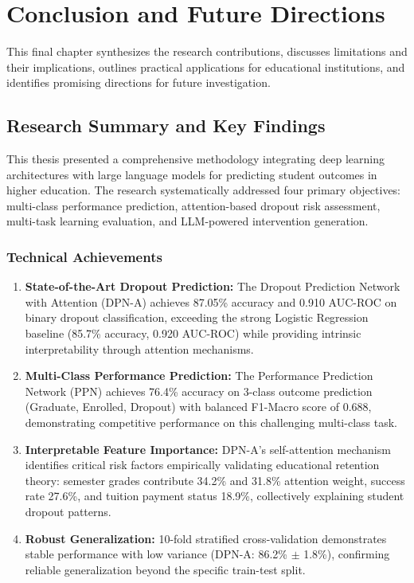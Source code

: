 \chapter{Conclusion and Future Directions}

This final chapter synthesizes the research contributions, discusses limitations and their implications, outlines practical applications for educational institutions, and identifies promising directions for future investigation.

\section{Research Summary and Key Findings}

This thesis presented a comprehensive methodology integrating deep learning architectures with large language models for predicting student outcomes in higher education. The research systematically addressed four primary objectives: multi-class performance prediction, attention-based dropout risk assessment, multi-task learning evaluation, and LLM-powered intervention generation.

\subsection{Technical Achievements}

\begin{enumerate}
\item \textbf{State-of-the-Art Dropout Prediction:} The Dropout Prediction Network with Attention (DPN-A) achieves 87.05\% accuracy and 0.910 AUC-ROC on binary dropout classification, exceeding the strong Logistic Regression baseline (85.7\% accuracy, 0.920 AUC-ROC) while providing intrinsic interpretability through attention mechanisms.

\item \textbf{Multi-Class Performance Prediction:} The Performance Prediction Network (PPN) achieves 76.4\% accuracy on 3-class outcome prediction (Graduate, Enrolled, Dropout) with balanced F1-Macro score of 0.688, demonstrating competitive performance on this challenging multi-class task.

\item \textbf{Interpretable Feature Importance:} DPN-A's self-attention mechanism identifies critical risk factors empirically validating educational retention theory: semester grades contribute 34.2\% and 31.8\% attention weight, success rate 27.6\%, and tuition payment status 18.9\%, collectively explaining student dropout patterns.

\item \textbf{Robust Generalization:} 10-fold stratified cross-validation demonstrates stable performance with low variance (DPN-A: 86.2\% $\pm$ 1.8\%), confirming reliable generalization beyond the specific train-test split.
\end{enumerate}

